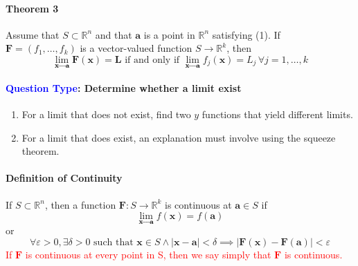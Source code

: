 \documentclass[11pt]{article}
\newcommand{\tb}[1]{\textbf{#1}}
\newcommand{\real}[0]{\mathbb{R}}
\newcommand{\vx}[0]{\tb{x}}
\newcommand{\va}[0]{\tb{a}}
\newcommand{\vf}[0]{\tb{F}}
\newcommand{\vL}[0]{\tb{L}}
\newcommand{\lima}{\underset{\vx \rightarrow \va}{\lim}}
\begin{document}
\paragraph{Theorem 3} Assume that $S \subset \real^n$ and that $\va$ is a point in $\real^n$ satisfying (1). If $\vf = (f_1, \hdots, f_k)$ is a vector-valued function $S \rightarrow \real^k$, then
$$\lima \vf(\vx) = \vL \mbox{ if and only if } \lima f_j(\vx) = L_j \, \forall j = 1, \hdots, k$$

\paragraph{\textcolor{blue}{Question Type}: Determine whether a limit exist}
\begin{enumerate}
	\item For a limit that does not exist, find two $y$ functions that yield different limits.
	\item For a limit that does exist, an explanation must involve using the squeeze theorem.
\end{enumerate}


\paragraph{Definition of Continuity}
If $S \subset \real^n$, then a function $\vf: S \rightarrow \real^k$ is continuous at $\va \in S$ if 
$$ \lima f(\vx) = f(\va)$$ or
$$\forall \varepsilon > 0, \exists \delta > 0 \mbox{ such that } \vx \in S \wedge |\vx - \va| < \delta \implies |\vf(\vx) - \vf(\va)| < \varepsilon$$
\textcolor{red}{If $\vf$ is continuous at every point in S, then we say simply that $\vf$ is continuous.}
\end{document}
